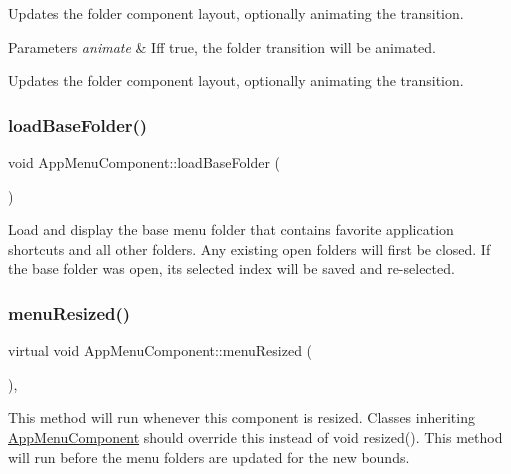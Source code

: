 Updates the folder component layout, optionally animating the transition.


\begin{DoxyParams}{Parameters}
{\em animate} & Iff true, the folder transition will be animated.\\
\hline
\end{DoxyParams}
Updates the folder component layout, optionally animating the transition. \mbox{\label{classAppMenuComponent_ada3fb52b04dd685b0f84c1870ed4bad2}} 
\subsubsection{\texorpdfstring{load\+Base\+Folder()}{loadBaseFolder()}}
{\footnotesize\ttfamily void App\+Menu\+Component\+::load\+Base\+Folder (\begin{DoxyParamCaption}{ }\end{DoxyParamCaption})\hspace{0.3cm}{\ttfamily [protected]}}

Load and display the base menu folder that contains favorite application shortcuts and all other folders. Any existing open folders will first be closed. If the base folder was open, its selected index will be saved and re-\/selected. \mbox{\label{classAppMenuComponent_a722d34923b746830bad57e960c4076a2}} 
\subsubsection{\texorpdfstring{menu\+Resized()}{menuResized()}}
{\footnotesize\ttfamily virtual void App\+Menu\+Component\+::menu\+Resized (\begin{DoxyParamCaption}{ }\end{DoxyParamCaption})\hspace{0.3cm}{\ttfamily [inline]}, {\ttfamily [virtual]}}

This method will run whenever this component is resized. Classes inheriting \mbox{\hyperlink{classAppMenuComponent}{App\+Menu\+Component}} should override this instead of void resized(). This method will run before the menu folders are updated for the new bounds. 

